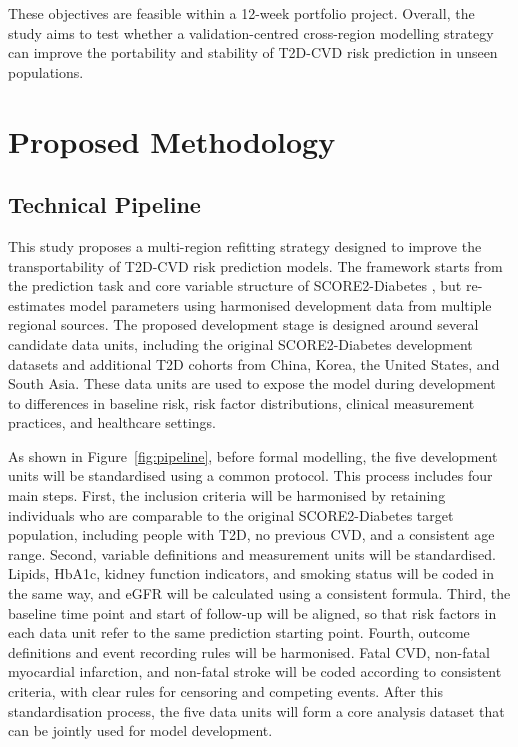 \documentclass[conference]{IEEEtran}
\begin{document}
These objectives are feasible within a 12-week portfolio project. Overall, the study aims to test whether a validation-centred cross-region modelling strategy can improve the portability and stability of T2D-CVD risk prediction in unseen populations.




\section{Proposed Methodology}

\subsection{Technical Pipeline}
This study proposes a multi-region refitting strategy designed to improve the transportability of T2D-CVD risk prediction models. The framework starts from the prediction task and core variable structure of SCORE2-Diabetes \cite{score22023score2}, but re-estimates model parameters using harmonised development data from multiple regional sources. The proposed development stage is designed around several candidate data units, including the original SCORE2-Diabetes development datasets and additional T2D cohorts from China, Korea, the United States, and South Asia. These data units are used to expose the model during development to differences in baseline risk, risk factor distributions, clinical measurement practices, and healthcare settings.


As shown in Figure~\ref{fig:pipeline}, before formal modelling, the five development units will be standardised using a common protocol. This process includes four main steps. First, the inclusion criteria will be harmonised by retaining individuals who are comparable to the original SCORE2-Diabetes target population, including people with T2D, no previous CVD, and a consistent age range. Second, variable definitions and measurement units will be standardised. Lipids, HbA1c, kidney function indicators, and smoking status will be coded in the same way, and eGFR will be calculated using a consistent formula. Third, the baseline time point and start of follow-up will be aligned, so that risk factors in each data unit refer to the same prediction starting point. Fourth, outcome definitions and event recording rules will be harmonised. Fatal CVD, non-fatal myocardial infarction, and non-fatal stroke will be coded according to consistent criteria, with clear rules for censoring and competing events. After this standardisation process, the five data units will form a core analysis dataset that can be jointly used for model development.
\end{document}
